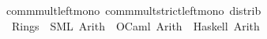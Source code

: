 \begin{isabellebody}
\endisatagproof
{\isafoldproof}%
%
\isadelimproof
\isanewline
%
\endisadelimproof
\isanewline
{}\isamarkupfalse%
\isanewline
\isanewline
\isanewline
{}\isamarkupfalse%
\ {\isacharparenleft}{\kern0pt}\ comm{\isacharunderscore}{\kern0pt}mult{\isacharunderscore}{\kern0pt}left{\isacharunderscore}{\kern0pt}mono\ comm{\isacharunderscore}{\kern0pt}mult{\isacharunderscore}{\kern0pt}strict{\isacharunderscore}{\kern0pt}left{\isacharunderscore}{\kern0pt}mono\ distrib\isanewline
\isanewline
{}\isamarkupfalse%
\isanewline
\ \ \ Rings\ {\isasymrightharpoonup}\ {\isacharparenleft}{\kern0pt}SML{\isacharparenright}{\kern0pt}\ Arith\ \ {\isacharparenleft}{\kern0pt}OCaml{\isacharparenright}{\kern0pt}\ Arith\ \ {\isacharparenleft}{\kern0pt}Haskell{\isacharparenright}{\kern0pt}\ Arith\isanewline
%
\isadelimtheory
\isanewline
%
\endisadelimtheory
%
\isatagtheory
{}\isamarkupfalse%
%
\endisatagtheory
{\isafoldtheory}%
%
\isadelimtheory
%
\endisadelimtheory
%
\end{isabellebody}%
\endinput
